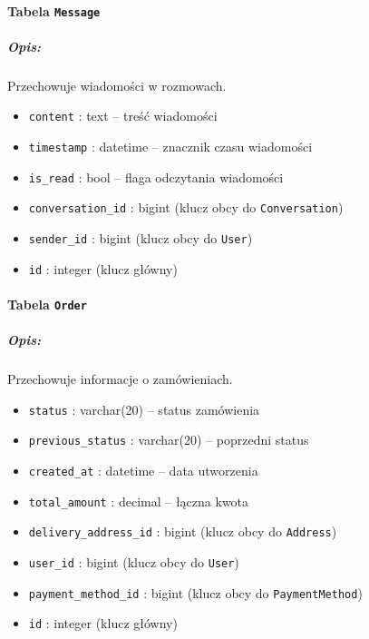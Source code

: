 \documentclass[12pt,a4paper,oneside]{article}
\theoremstyle{definition}
\numberwithin{equation}{section}
\begin{document}
\paragraph{Tabela \texttt{Message}}
\subparagraph{Opis:} Przechowuje wiadomości w rozmowach.
\begin{itemize}
    \item \texttt{content} : text – treść wiadomości
    \item \texttt{timestamp} : datetime – znacznik czasu wiadomości
    \item \texttt{is\string_read} : bool – flaga odczytania wiadomości
    \item \texttt{conversation\string_id} : bigint (klucz obcy do \texttt{Conversation})
    \item \texttt{sender\string_id} : bigint (klucz obcy do \texttt{User})
    \item \texttt{id} : integer (klucz główny)
\end{itemize}

\paragraph{Tabela \texttt{Order}}
\subparagraph{Opis:} Przechowuje informacje o zamówieniach.
\begin{itemize}
    \item \texttt{status} : varchar(20) – status zamówienia
    \item \texttt{previous\string_status} : varchar(20) – poprzedni status
    \item \texttt{created\string_at} : datetime – data utworzenia
    \item \texttt{total\string_amount} : decimal – łączna kwota
    \item \texttt{delivery\string_address\string_id} : bigint (klucz obcy do \texttt{Address})
    \item \texttt{user\string_id} : bigint (klucz obcy do \texttt{User})
    \item \texttt{payment\string_method\string_id} : bigint (klucz obcy do \texttt{PaymentMethod})
    \item \texttt{id} : integer (klucz główny)
\end{itemize}
\end{document}
